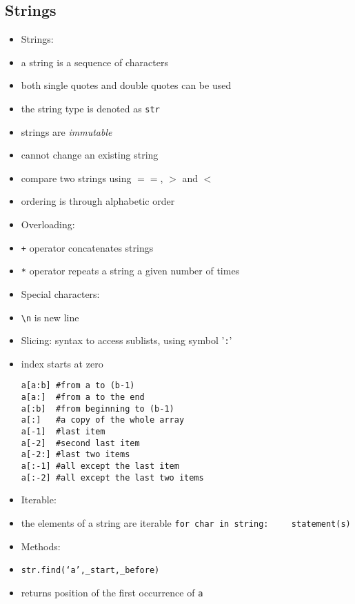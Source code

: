 \documentclass[onecolumn]{IEEEtran} %
\begin{document}
\subsection{Strings}
\begin{itemize}
    \item Strings:
    \bi
        \item a string is a sequence of characters
        \bi
            \item both single quotes and double quotes can be used
        \ei
        \item the string type is denoted as \verb|str|
        \item strings are \emph{immutable}
        \bi
             \item cannot change an existing string
        \ei
        \item compare two strings using  $==$, $>$ and $<$
        \bi
            \item ordering is through alphabetic order
        \ei
    \ei
    \item Overloading:
    \bi
        \item \verb|+| operator concatenates strings
        \item \verb|*| operator repeats a string a given number of times
    \ei
    \item Special characters:
    \bi
        \item \verb|\n| is new line
    \ei
    \item Slicing: syntax to access sublists, using symbol '\verb|:|'
    \bi
        \item index starts at zero
    \ei
    \begin{verbatim}
a[a:b] #from a to (b-1)
a[a:]  #from a to the end
a[:b]  #from beginning to (b-1)
a[:]   #a copy of the whole array
a[-1]  #last item
a[-2]  #second last item
a[-2:] #last two items
a[:-1] #all except the last item
a[:-2] #all except the last two items
    \end{verbatim}
    \item Iterable:
    \bi
        \item the elements of a string are iterable
        \newline \verb|for char in string:|
        \newline \verb|    statement(s)|
    \ei
    \item Methods:
    \bi
        \item \verb|str.find(‘a’,_start,_before)|
        \bi
            \item returns position of the first occurrence of \verb|a|

\end{itemize}
\end{document}
